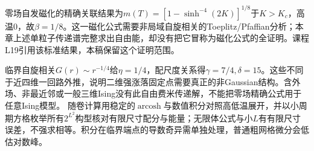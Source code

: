 零场自发磁化的精确关联结果为$m(T)=[1-\sinh^{-4}(2K)]^{1/8}$于$K>K_c$，高温0，故$\beta=1/8$。这一磁化公式需要非局域自旋相关的Toeplitz/Pfaffian分析；本章上述单粒子传递谱完整求出自由能，却没有把它冒称为磁化公式的全证明。课程L19引用该标准结果，本稿保留这个证明范围。

临界自旋相关$G(r)\sim r^{-1/4}$给$\eta=1/4$，配尺度关系得$\gamma=7/4,\delta=15$。这些不同于近四维一回路外推，说明二维强涨落固定点需要真正的非Gaussian结构。含外场、非最近邻或一般三维Ising没有此自由费米传递解，不能把零场精确公式用于任意Ising模型。
随卷计算用稳定的$\operatorname{arcosh}$与数值积分对照高低温展开，并以小周期方格枚举所有$2^{L^2}$构型核对有限尺寸配分与能量；无限体公式与小$L$有有限尺寸误差，不强求相等。积分在临界端点的导数奇异需单独处理，普通粗网格微分会低估对数峰。
